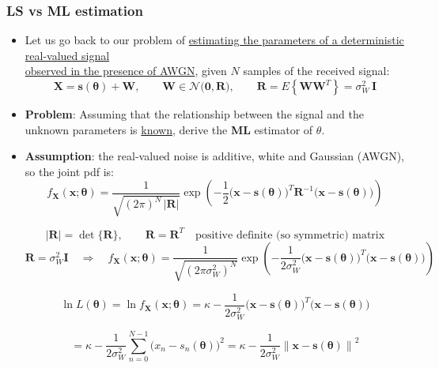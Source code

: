 \subsubsection{LS vs ML estimation}
\begin{itemize}
    \item Let us go back to our problem of \underline{estimating the parameters of a deterministic real-valued signal}\\
    \underline{observed in the presence of AWGN}, given \(N\) samples of the received signal:
    \[
\mathbf{X} = \mathbf{s}(\boldsymbol{\theta}) + \mathbf{W}, 
\qquad
\mathbf{W} \in \mathcal{N}\big( \mathbf{0}, \mathbf{R} \big), 
\qquad
\mathbf{R} = E\left\{ \mathbf{W}\mathbf{W}^T \right\} 
= \sigma_W^{2}\,\mathbf{I}
\]
    \item \textbf{Problem}: Assuming that the relationship between the signal and the unknown parameters is \underline{known}, derive the \textbf{ML} estimator of \(\theta\).
\newpage
    \item \textbf{Assumption}: the real-valued noise is additive, white and Gaussian (AWGN), so the joint pdf is:
    \[
f_{\mathbf{X}}(\mathbf{x}; \boldsymbol{\theta})
=
\frac{1}{\sqrt{(2\pi)^{N} \, |\mathbf{R}|}}
\exp\!\left(
-\frac{1}{2}
\big(\mathbf{x} - \mathbf{s}(\boldsymbol{\theta})\big)^{T}
\mathbf{R}^{-1}
\big(\mathbf{x} - \mathbf{s}(\boldsymbol{\theta})\big)
\right)
\]

\[
|\mathbf{R}| = \det\{\mathbf{R}\},
\qquad
\mathbf{R} = \mathbf{R}^{T}
\quad\text{positive definite (so symmetric) matrix}
\]
\[
\mathbf{R} = \sigma_W^{2}\mathbf{I}
\quad \Longrightarrow \quad
f_{\mathbf{X}}(\mathbf{x}; \boldsymbol{\theta})
=
\frac{1}{\sqrt{(2\pi\sigma_W^{2})^{N}}}
\exp\!\left(
-\frac{1}{2\sigma_W^{2}}
\big(\mathbf{x} - \mathbf{s}(\boldsymbol{\theta})\big)^{T}
\big(\mathbf{x} - \mathbf{s}(\boldsymbol{\theta})\big)
\right)
\]

\[
\ln L(\boldsymbol{\theta})
=
\ln f_{\mathbf{X}}(\mathbf{x}; \boldsymbol{\theta})
=
\kappa
-\frac{1}{2\sigma_W^{2}}
\big(\mathbf{x} - \mathbf{s}(\boldsymbol{\theta})\big)^{T}
\big(\mathbf{x} - \mathbf{s}(\boldsymbol{\theta})\big)
\]

\[
=
\kappa
-\frac{1}{2\sigma_W^{2}}
\sum_{n=0}^{N-1}
\big(x_n - s_n(\boldsymbol{\theta})\big)^{2}
=
\kappa
-\frac{1}{2\sigma_W^{2}}
\left\|\mathbf{x} - \mathbf{s}(\boldsymbol{\theta})\right\|^{2}
\]


\end{itemize}
